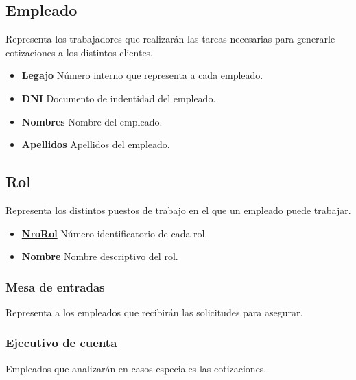 \documentclass[a4paper,11pt]{article}
\begin{document}
\subsection{Empleado}

Representa los trabajadores que realizarán las tareas necesarias para generarle cotizaciones
a los distintos clientes.

\begin{itemize}
   
  \item \textbf{\uline{Legajo}} Número interno que representa a cada empleado.
  
  \item \textbf{DNI} Documento de indentidad del empleado.
  
  \item \textbf{Nombres} Nombre del empleado.
  
  \item \textbf{Apellidos} Apellidos del empleado.
  
\end{itemize}

\subsection{Rol}

Representa los distintos puestos de trabajo en el que un empleado puede trabajar.

\begin{itemize}
   
  \item \textbf{\uline{NroRol}} Número identificatorio de cada rol.
  
  \item \textbf{Nombre} Nombre descriptivo del rol.
  
\end{itemize}

\subsubsection{Mesa de entradas}

Representa a los empleados que recibirán las solicitudes para asegurar.

\subsubsection{Ejecutivo de cuenta}

Empleados que analizarán en casos especiales las cotizaciones.
\end{document}
